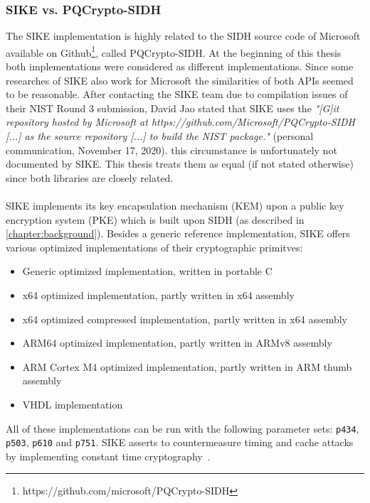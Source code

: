 \subsubsection{SIKE vs. PQCrypto-SIDH}\label{existing:sike_vs_pqcrypto}
The \gls{SIKE} implementation is highly related to the \gls{SIDH} source code of Microsoft available on Github\footnote{https://github.com/microsoft/PQCrypto-SIDH}, called \gls{PQCrypto-SIDH}. At the beginning of this thesis both implementations were considered as different implementations. Since some researches of \gls{SIKE} also work for Microsoft the similarities of both APIs seemed to be reasonable. After contacting the \gls{SIKE} team due to compilation issues of their NIST Round 3 submission, David Jao stated that \gls{SIKE} uses the \textit{"[G]it repository hosted by Microsoft at
https://github.com/Microsoft/PQCrypto-SIDH [...] as the source
repository [...] to build the NIST package."} (personal communication, November 17, 2020). this circumstance is unfortunately not documented by \gls{SIKE}. This thesis treats them as equal (if not stated otherwise) since both libraries are closely related.
\\\\
\gls{SIKE} implements its key encapsulation mechanism (\gls{KEM}) upon a public key encryption system (\gls{PKE}) which is built upon \gls{SIDH} (as described in \autoref{chapter:background}). Besides a generic reference implementation, \gls{SIKE} offers various optimized implementations of their cryptographic primitves:
\begin{itemize}
  \item Generic optimized implementation, written in portable C
  \item x64 optimized implementation, partly written in x64 assembly
  \item x64 optimized compressed implementation, partly written in x64 assembly
  \item ARM64 optimized implementation, partly written in ARMv8 assembly
  \item ARM Cortex M4 optimized implementation, partly written in ARM thumb assembly
  \item VHDL implementation
\end{itemize}
All of these implementations can be run with the following parameter sets: \texttt{p434}, \texttt{p503}, \texttt{p610} and \texttt{p751}. \gls{SIKE} asserts to countermeasure timing and cache attacks by implementing constant time cryptography~\parencite{sike2020spec}.

